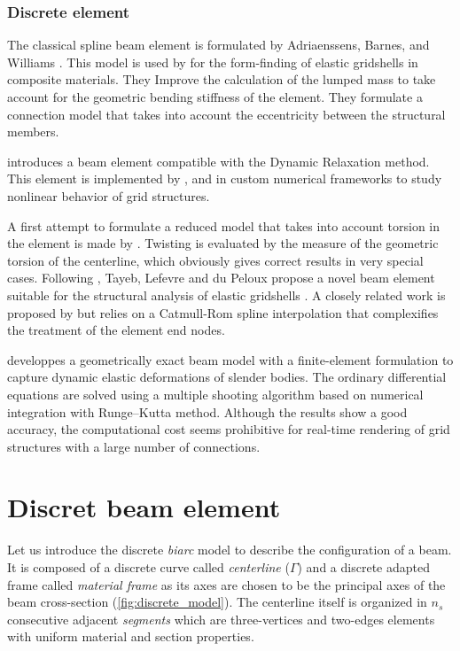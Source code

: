 \subsubsection{Discrete element}

The classical  spline beam element is formulated by Adriaenssens, Barnes, and Williams \cite{Barnes1999,Adriaenssens1999,Adriaenssens2001}. This model is used by \cite{Douthe2006} for the form-finding of elastic gridshells in composite materials. They Improve the calculation of the lumped mass to take account for the geometric bending stiffness of the element. They formulate a connection model that takes into account the eccentricity between the structural members.

 introduces a  beam element compatible with the Dynamic Relaxation method. This element is implemented by ,  and \cite{DAmico2014} in custom numerical frameworks to study nonlinear behavior of grid structures.

A first attempt to formulate a reduced model that takes into account torsion in the element is made by . Twisting is evaluated by the measure of the geometric torsion of the centerline, which obviously gives correct results in very special cases. Following , Tayeb, Lefevre and du Peloux propose a novel  beam element suitable for the structural analysis of elastic gridshells \cite{DuPeloux2015,Lefevre2017}. A closely related work is proposed by  but relies on a Catmull-Rom spline interpolation that complexifies the treatment of the element end nodes.

 developpes a geometrically exact beam model with a finite-element formulation to capture dynamic elastic deformations of slender bodies. The ordinary differential equations are solved using a multiple shooting algorithm based on numerical integration with Runge–Kutta method. Although the results show a good accuracy, the computational cost seems prohibitive for real-time rendering of grid structures with a large number of connections.






\section{Discret beam element}\label{sec=dmodel}
Let us introduce the discrete \emph{biarc} model to describe the configuration of a beam. It is composed of a discrete curve called \emph{centerline} ($\Gamma$) and a discrete adapted frame called \emph{material frame} as its axes are chosen to be the principal axes of the beam cross-section (\cref{fig:discrete_model}). The centerline itself is organized in $n_s$ consecutive adjacent \emph{segments} which are three-vertices and two-edges elements with uniform material and section properties.

